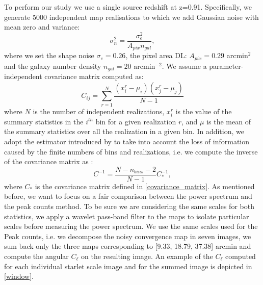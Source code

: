 \documentclass[twocolumn,twocolappendix]{aastex63}
\newcommand{\denise}[1]{{\color{red}DL: #1}}
\begin{document}
To perform our study we use a single source redshift at z=0.91. Specifically, we generate 5000 independent map realisations to which we add Gaussian noise with mean zero and variance:
 \begin{equation}
     \sigma^2_n= \frac{\sigma_e^2}{A_{pix}n_{gal}},
 \end{equation}
where we set the shape noise $\sigma_e = 0.26$, the pixel area \denise{$A_{pix}=0.29$ arcmin$^2$ and the galaxy number density $n_{gal}=20$ arcmin$^{-2}$. } 
We assume a parameter-independent covariance matrix computed as:
\begin{equation}\label{covariance_matrix}
    C_{ij}=\sum_{r=1}^N
    \frac{(x_i^r-\mu_i)(x_j^r-\mu_j)}{N-1}
\end{equation}
where $N$ is the number of independent realizations, $x_i^r$ is the value of the summary statistics in the $i^{th}$ bin for a given realization $r$, and $\mu$ is the mean of the summary statistics over all the realization in a given bin. 
In addition, we adopt the estimator introduced by \cite{hartlap2007your} to take into account the loss of information caused by the finite numbers of bins and realizations, i.e. we compute the inverse of the covariance matrix as :
\begin{equation}
    C^{-1}=\frac{N-n_{bins}-2}{N-1}C_{*}^{-1},
\end{equation}
where $C_{*}$ is the covariance matrix defined in \autoref{covariance_matrix}. 
As mentioned before, we want to focus on a fair comparison between the power spectrum and the peak counts method. To be sure we are considering the same scales for both statistics, we apply a wavelet pass-band filter to the maps to isolate particular scales before measuring the power spectrum.  We use the same scales used for the Peak counts, i.e. we decompose the noisy convergence map in seven images, we sum back only the three maps corresponding to [9.33, 18.79, 37.38] arcmin and compute the angular $C_{\ell}$ on the resulting image.
An example of the $C_{\ell}$ computed for each individual starlet scale image and for the summed image is depicted in \autoref{window}.
\end{document}
